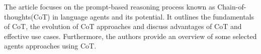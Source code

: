 \documentclass{article}
\begin{document}
The article \cite{zhang_igniting_2023} focuses on the prompt-based reasoning process known as Chain-of-thoughts(CoT) in language agents and its potential. It outlines the fundamentals of CoT, the evolution of CoT approaches and discuss advantages of CoT and effective use cases. Furthermore, the authors provide an overview of some selected agents approaches using CoT. 

%
\end{document}
